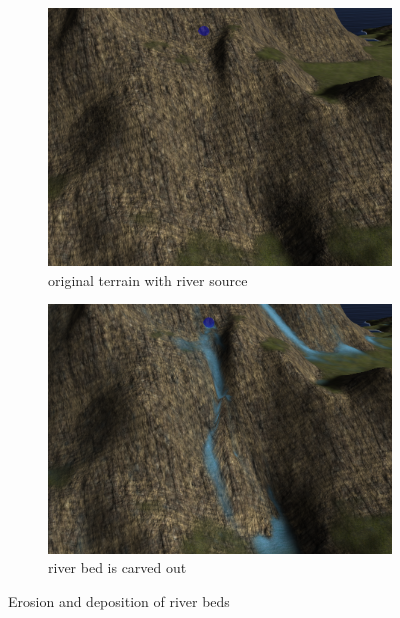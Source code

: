 \documentclass[journal, letterpaper]{IEEEtran}
\begin{document}
\begin{figure}
	\centering
	\begin{subfigure}[b]{0.45\textwidth}
		\includegraphics[width=\textwidth]{images/River2}
		\caption{original terrain with river source}
		\label{fig:river1}
	\end{subfigure}
	\begin{subfigure}[b]{0.45\textwidth}
		\includegraphics[width=\textwidth]{images/River1}
		\caption{river bed is carved out}
		\label{fig:river2}
	\end{subfigure}
	\caption{Erosion and deposition of river beds}\label{fig:river}
\end{figure}
\end{document}
